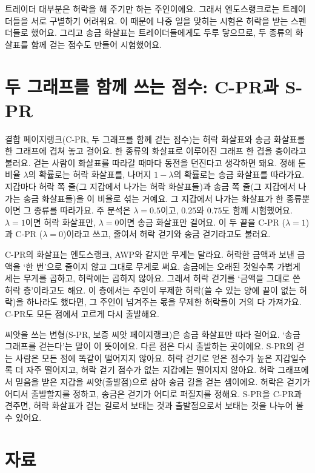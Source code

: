 트레이더 대부분은 허락을 해 주기만 하는 주인이에요. 그래서 엔도스랭크로는 트레이더들을 서로 구별하기 어려워요. 이 때문에 나중 일을 맞히는 시험은 허락을 받는 스펜더들로 했어요. 그리고 송금 화살표는 트레이더들에게도 두루 닿으므로, 두 종류의 화살표를 함께 걷는 점수도 만들어 시험했어요.

\section*{두 그래프를 함께 쓰는 점수: C-PR과 S-PR}

결합 페이지랭크(C-PR, 두 그래프를 함께 걷는 점수)는 허락 화살표와 송금 화살표를 한 그래프에 겹쳐 놓고 걸어요. 한 종류의 화살표로 이루어진 그래프 한 겹을 층이라고 불러요. 걷는 사람이 화살표를 따라갈 때마다 동전을 던진다고 생각하면 돼요. 정해 둔 비율 $\lambda$의 확률로는 허락 화살표를, 나머지 $1-\lambda$의 확률로는 송금 화살표를 따라가요. 지갑마다 허락 쪽 줄(그 지갑에서 나가는 허락 화살표들)과 송금 쪽 줄(그 지갑에서 나가는 송금 화살표들)을 이 비율로 섞는 거예요. 그 지갑에서 나가는 화살표가 한 종류뿐이면 그 종류를 따라가요. 주 분석은 $\lambda=0.5$이고, $0.25$와 $0.75$도 함께 시험했어요. $\lambda=1$이면 허락 화살표만, $\lambda=0$이면 송금 화살표만 걸어요. 이 두 끝을 C-PR ($\lambda=1$)과 C-PR ($\lambda=0$)이라고 쓰고, 줄여서 허락 걷기와 송금 걷기라고도 불러요.

C-PR의 화살표는 엔도스랭크, AWP와 같지만 무게는 달라요. 허락한 금액과 보낸 금액을 ‘한 번’으로 줄이지 않고 그대로 무게로 써요. 송금에는 오래된 것일수록 가볍게 세는 무게를 곱하고, 허락에는 곱하지 않아요. 그래서 허락 걷기를 ‘금액을 그대로 쓴 허락 층’이라고도 해요. 이 층에서는 주인이 무제한 허락(쓸 수 있는 양에 끝이 없는 허락)을 하나라도 했다면, 그 주인이 넘겨주는 몫을 무제한 허락들이 거의 다 가져가요. C-PR도 모든 점에서 고르게 다시 출발해요.

씨앗을 쓰는 변형(S-PR, 보증 씨앗 페이지랭크)은 송금 화살표만 따라 걸어요. ‘송금 그래프를 걷는다’는 말이 이 뜻이에요. 다른 점은 다시 출발하는 곳이에요. S-PR의 걷는 사람은 모든 점에 똑같이 떨어지지 않아요. 허락 걷기로 얻은 점수가 높은 지갑일수록 더 자주 떨어지고, 허락 걷기 점수가 없는 지갑에는 떨어지지 않아요. 허락 그래프에서 믿음을 받은 지갑을 씨앗(출발점)으로 삼아 송금 길을 걷는 셈이에요. 허락은 걷기가 어디서 출발할지를 정하고, 송금은 걷기가 어디로 퍼질지를 정해요. S-PR을 C-PR과 견주면, 허락 화살표가 걷는 길로서 보태는 것과 출발점으로서 보태는 것을 나누어 볼 수 있어요.

\section*{자료}

